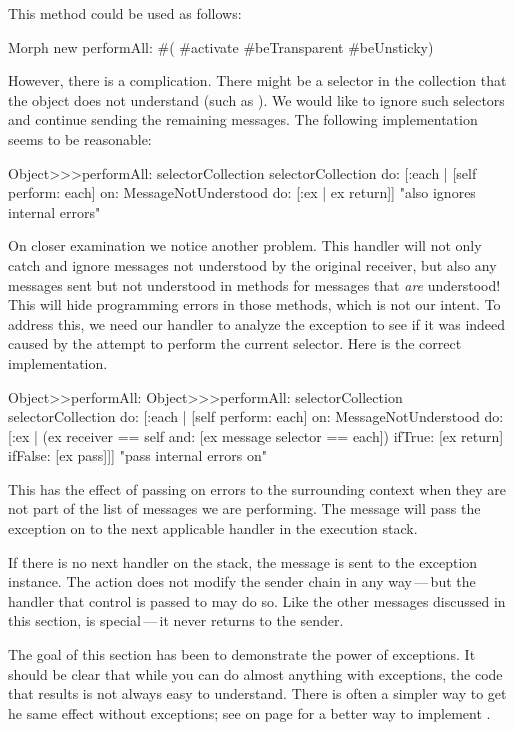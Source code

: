 \documentclass[a4paper,10pt,twoside]{book}
\begin{document}
This method could be used as follows:
\begin{code}{}
Morph new performAll: #( #activate #beTransparent #beUnsticky)
\end{code}

However, there is a complication. There might be a selector in the collection that the object does not understand (such as ). We would like to ignore such selectors and continue sending the remaining messages. The following implementation seems to be reasonable:

\begin{code}{}
Object>>>performAll: selectorCollection 
	selectorCollection do: [:each |
		[self perform: each]
			on: MessageNotUnderstood
			do: [:ex | ex return]]    "also ignores internal errors"
\end{code}

On closer examination we notice another problem. This handler will not only catch and ignore messages not understood by the original receiver, but also any messages sent but not understood in methods for messages that \emph{are} understood! This will hide programming errors in those methods, which is not our intent.
To address this, we need our handler to analyze the exception to see if it was indeed caused by the attempt to perform the current selector.
Here is the correct implementation.
\begin{method}[objectPerformAll]{Object>>performAll:}
Object>>>performAll: selectorCollection 
	selectorCollection do: [:each | 
		[self perform: each] 
			on: MessageNotUnderstood 
			do: [:ex | (ex receiver == self and: [ex message selector == each]) 
				ifTrue: [ex return] 
				ifFalse: [ex pass]]]    "pass internal errors on"
\end{method}

This has the effect of passing on  errors to the surrounding context when they are not part of the list of messages we are performing. The  message will pass the exception on to the next applicable handler in the execution stack.

If there is no next handler on the stack, the  message is sent to the exception instance. The  action does not modify the sender chain in any way\,---\,but the handler that control is passed to may do so. Like the other messages discussed in this section,  is special\,---\,it never returns to the sender.

The goal of this section has been to demonstrate the power of exceptions.
It should be clear that while you can do almost anything with exceptions, the code
that results is not always easy to understand.   
There is often a simpler way to get he same effect without exceptions; see  on page \pageref{mth:simplerObjectPerfromAll} for a better way to implement .
\end{document}
